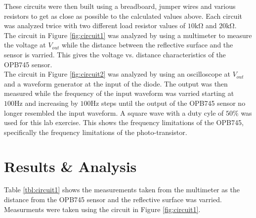 \documentclass[CMPE]{KGCOEReport}
\begin{document}
These circuits were then built using a breadboard, jumper wires and various 
resistors to get as close as possible to the calculated values above.
Each circuit was analyzed twice with two different load resistor values of 
$10\si{\kilo\ohm}$ and $20\si{\kilo\ohm}$. \\

The circuit in Figure \ref{fig:circuit1} was analyzed by using a multimeter to measure the voltage 
at $V_{out}$ while the distance between the reflective surface and the sensor is varried.
This gives the voltage vs. distance characteristics of the OPB745 sensor.\\

The circuit in Figure \ref{fig:circuit2} was analyzed by using an oscilloscope at $V_{out}$ and 
a waveform generator at the input of the diode. The output was then measured while the frequency
of the input waveform was varried starting at $100\si\hertz$ and increasing by $100\si\hertz$ steps
until the output of the OPB745 sensor no longer resembled the input waveform. A square wave with a duty
cyle of $50\%$ was used for this lab exercise. This shows the frequency limitations of the OPB745, specifically
the frequency limitations of the photo-transistor.



\section{Results \& Analysis}

Table \ref{tbl:circuit1} shows the measurements taken from the multimeter as the distance
from the OPB745 sensor and the reflective surface was varried. Measurments were taken using the
circuit in Figure \ref{fig:circuit1}.
\end{document}
